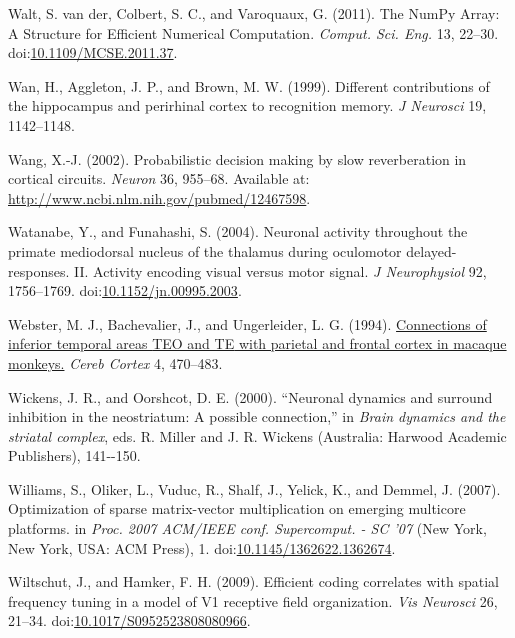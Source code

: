 \documentclass[
  11pt,
  a4paper,
]{scrbook}
\newlength{\cslhangindent}
\newenvironment{CSLReferences}[2] %
 {\begin{list}{}{%
  \setlength{\itemindent}{0pt}
  \setlength{\leftmargin}{0pt}
  \setlength{\parsep}{0pt}
  \ifodd #1
   \setlength{\leftmargin}{\cslhangindent}
   \setlength{\itemindent}{-1\cslhangindent}
  \fi
  \setlength{\itemsep}{#2\baselineskip}}}
 {\end{list}}
\begin{document}
\begin{CSLReferences}{1}{1}
Walt, S. van der, Colbert, S. C., and Varoquaux, G. (2011). {The NumPy
Array: A Structure for Efficient Numerical Computation}. \emph{Comput.
Sci. Eng.} 13, 22--30.
doi:\href{https://doi.org/10.1109/MCSE.2011.37}{10.1109/MCSE.2011.37}.

Wan, H., Aggleton, J. P., and Brown, M. W. (1999). Different
contributions of the hippocampus and perirhinal cortex to recognition
memory. \emph{J Neurosci} 19, 1142--1148.

Wang, X.-J. (2002). {Probabilistic decision making by slow reverberation
in cortical circuits.} \emph{Neuron} 36, 955--68. Available at:
\url{http://www.ncbi.nlm.nih.gov/pubmed/12467598}.

Watanabe, Y., and Funahashi, S. (2004). Neuronal activity throughout the
primate mediodorsal nucleus of the thalamus during oculomotor
delayed-responses. {II. Activity} encoding visual versus motor signal.
\emph{J Neurophysiol} 92, 1756--1769.
doi:\href{https://doi.org/10.1152/jn.00995.2003}{10.1152/jn.00995.2003}.

Webster, M. J., Bachevalier, J., and Ungerleider, L. G. (1994).
\href{https://www.ncbi.nlm.nih.gov/pubmed/7530521}{Connections of
inferior temporal areas {TEO and TE} with parietal and frontal cortex in
macaque monkeys.} \emph{Cereb Cortex} 4, 470--483.

Wickens, J. R., and Oorshcot, D. E. (2000). {``Neuronal dynamics and
surround inhibition in the neostriatum: A possible connection,''} in
\emph{Brain dynamics and the striatal complex}, eds. R. Miller and J. R.
Wickens (Australia: Harwood Academic Publishers), 141-\/-150.

Williams, S., Oliker, L., Vuduc, R., Shalf, J., Yelick, K., and Demmel,
J. (2007). {Optimization of sparse matrix-vector multiplication on
emerging multicore platforms}. in \emph{Proc. 2007 ACM/IEEE conf.
Supercomput. - SC '07} (New York, New York, USA: ACM Press), 1.
doi:\href{https://doi.org/10.1145/1362622.1362674}{10.1145/1362622.1362674}.

Wiltschut, J., and Hamker, F. H. (2009). Efficient coding correlates
with spatial frequency tuning in a model of V1 receptive field
organization. \emph{Vis Neurosci} 26, 21--34.
doi:\href{https://doi.org/10.1017/S0952523808080966}{10.1017/S0952523808080966}.


\end{CSLReferences}
\end{document}
